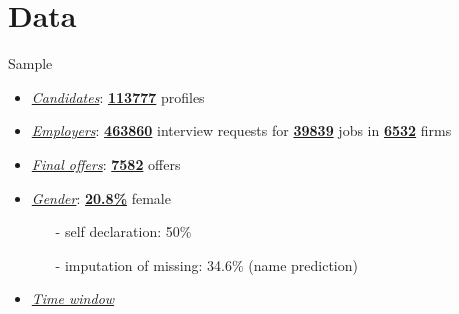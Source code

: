 \section{Data}

 \frame{\sectionpage}

\begin{frame}{Sample}
    \begin{itemize}
        \item {\color{frenchlilac!45!white}\underline{\textit{Candidates}}}: \underline{\textbf{113777}} profiles
        
        \item {\color{frenchlilac!45!white}\underline{\textit{Employers}}}: \underline{\textbf{463860}} interview requests for \textbf{\underline{39839}} jobs in \textbf{\underline{6532}} firms
        
        \item {\color{frenchlilac!45!white}\underline{\textit{Final offers}}}: \underline{\textbf{7582}} offers
        
        \vspace*{15pt}
        \item<2-> {\color{frenchlilac!45!white}\underline{\textit{Gender}}}: \underline{\textbf{20.8\%}} female
        \begin{itemize}
            \item[-] self declaration: 50\%
            \item[-] imputation of missing: 34.6\% (name prediction)
        \end{itemize}
        \item<3-> {\color{frenchlilac!45!white}\underline{\textit{Time window}}}
    \end{itemize}
\end{frame}

